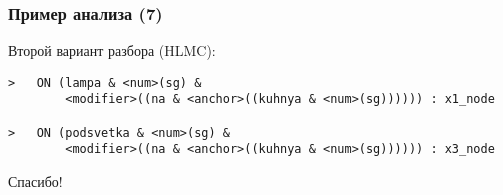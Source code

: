 \documentclass{beamer}
\begin{document}
\begin{frame}[fragile]
\frametitle{Пример анализа (7)}
Второй вариант разбора (HLMC):\\
\bigskip
\begin{center}
{\scriptsize \begin{verbatim}
>   ON (lampa & <num>(sg) & 
        <modifier>((na & <anchor>((kuhnya & <num>(sg)))))) : x1_node 

>   ON (podsvetka & <num>(sg) & 
        <modifier>((na & <anchor>((kuhnya & <num>(sg)))))) : x3_node 
\end{verbatim}
}                        
\end{center}
\end{frame}


\begin{frame}{}
    \thispagestyle{empty}
    \begin{center}
        {\large Спасибо!}
    \end{center}
\end{frame}


\end{document}
